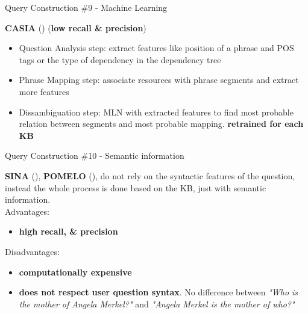 \documentclass{beamer}
\begin{document}
\begin{frame}{Query Construction \#9 - Machine Learning}
  \begin{card}
    \textbf{CASIA} (\cite{he2014a}) (\textbf{low recall \& precision})
    \begin{itemize}
      \item Question Analysis step: extract features like position of a phrase and POS tags or the type of dependency in the dependency tree 
      \item Phrase Mapping step: associate resources with phrase segments and extract more features
      \item Dissambiguation step: MLN with extracted features to find most probable relation between segments and most probable mapping. \textbf{retrained for each KB}
    \end{itemize}
  \end{card}
\end{frame}

\note{}

\begin{frame}{Query Construction \#10 - Semantic information}
  \begin{card}
    \textbf{SINA} (\cite{shekarpour2015a}), \textbf{POMELO} (\cite{hamon2014a}), \cite{zhang2016a} do not rely on the syntactic features of the question, instead the whole process is done based on the KB, just with semantic information. \\
    Advantages:
    \begin{itemize}
      \item \textbf{high recall, \& precision}
    \end{itemize}
    Disadvantages:
    \begin{itemize}
      \item \textbf{computationally expensive}
      \item \textbf{does not respect user question syntax}. No difference between \textit{"Who is the mother of Angela Merkel?"} and \textit{"Angela Merkel is the mother of who?"}
    \end{itemize}
  \end{card}
\end{frame}

\note{}
\end{document}
